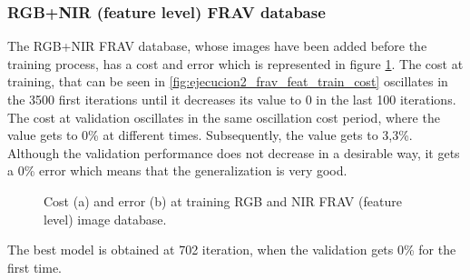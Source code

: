 \subsubsection{RGB+NIR (feature level) FRAV database}
The RGB+NIR FRAV database, whose images have been added before the training process, has a cost and error which is represented in figure \ref{fig:ejecucion2_frav_feat_train}. The cost at training, that can be seen in \ref{fig:ejecucion2_frav_feat_train_cost} oscillates in the 3500 first iterations until it decreases its value to 0 in the last 100 iterations. The cost at validation oscillates in the same oscillation cost period, where the value gets to 0\% at different times. Subsequently, the value gets to 3,3\%. Although the validation performance does not decrease in a desirable way, it gets a 0\% error which means that the generalization is very good.\\
\begin{figure}[H]
\centering
\caption{Cost (a) and error (b) at training RGB and NIR FRAV (feature level) image database.}
\label{fig:ejecucion2_frav_feat_train}
\end{figure}

The best model is obtained at 702 iteration, when the validation gets 0\% for the first time.

